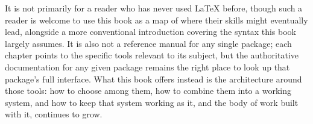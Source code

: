 It is not primarily for a reader who has never used LaTeX before, though such a reader is welcome to use this book as a map of where their skills might eventually lead, alongside a more conventional introduction covering the syntax this book largely assumes. It is also not a reference manual for any single package; each chapter points to the specific tools relevant to its subject, but the authoritative documentation for any given package remains the right place to look up that package's full interface. What this book offers instead is the architecture around those tools: how to choose among them, how to combine them into a working system, and how to keep that system working as it, and the body of work built with it, continues to grow.
